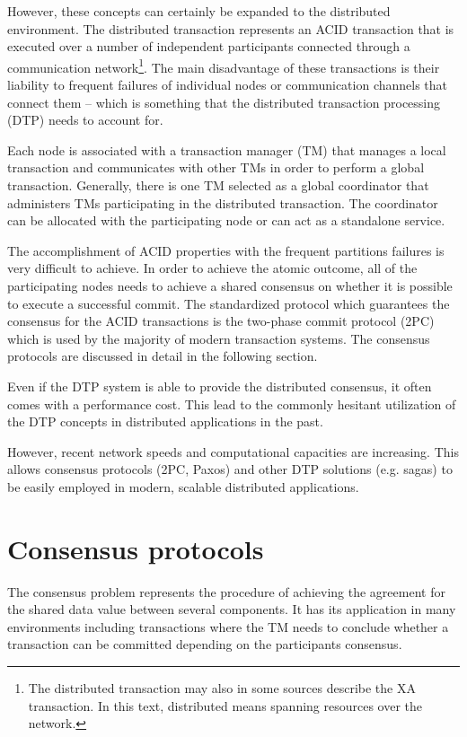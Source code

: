 \documentclass[oneside,
  digital, %
  table,   %
  lof,     %
  lot,     %
]{fithesis3}
\begin{document}
However, these concepts can certainly be expanded to the distributed environment. The distributed transaction represents an ACID transaction that is executed over a number of independent participants connected through a communication network\footnote{The distributed transaction may also in some sources describe the XA transaction. In this text, distributed means spanning resources over the network.}. The main disadvantage of these transactions is their liability to frequent failures of individual nodes or communication channels that connect them -- which is something that the distributed transaction processing (DTP) needs to account for. 

Each node is associated with a transaction manager (TM) that manages a local transaction and communicates with other TMs in order to perform a global transaction. Generally, there is one TM selected as a global coordinator that administers TMs participating in the distributed transaction. The coordinator can be allocated with the participating node or can act as a standalone service.

The accomplishment of ACID properties with the frequent partitions failures is very difficult to achieve. In order to achieve the atomic outcome, all of the participating nodes needs to achieve a shared consensus on whether it is possible to execute a successful commit. The standardized protocol which guarantees the consensus for the ACID transactions is the two-phase commit protocol (2PC) which is used by the majority of modern transaction systems. The consensus protocols are discussed in detail in the following section.

Even if the DTP system is able to provide the distributed consensus, it often comes with a performance cost. This lead to the commonly hesitant utilization of the DTP concepts in distributed applications in the past. 

However, recent network speeds and computational capacities are increasing. This allows consensus protocols (2PC, Paxos) and other DTP solutions (e.g. sagas) to be easily employed in modern, scalable distributed applications.



\section{Consensus protocols}
\label{sec:consensus-protocols}

The consensus problem represents the procedure of achieving the  agreement for the shared data value between several components. It has its application in many environments including transactions where the TM needs to conclude whether a transaction can be committed depending on the participants consensus.
\end{document}
